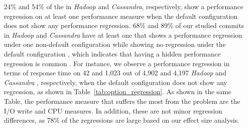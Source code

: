 24\% and 54\% of the \instance in \emph{Hadoop} and \emph{Cassandra}, respectively, show a performance regression on at least one performance measure when the default configuration does not show any performance regression. %
68\% and 89\% of our studied commits in \emph{Hadoop} and \emph{Cassandra} have at least one \instance that shows a performance regression under one non-default configuration while showing no regression under the default configuration , which indicates that having a hidden performance regression is common . For instance, we observe a performance regression in terms of response time on 42 and 1,023 out of 4,902 and 4,197 \emph{Hadoop} and \emph{Cassandra} \instance {}, respectively, when the default configuration does not show any regression, as shown in Table~\ref{tab:option_regression}. As shown in the same Table, the performance measure that suffers the most from the \inconsistent problem %
are the I/O write  and CPU measures. %
In addition, these are not minor regression differences, as 78\% of the regressions are large based on our effect size analysis. 



